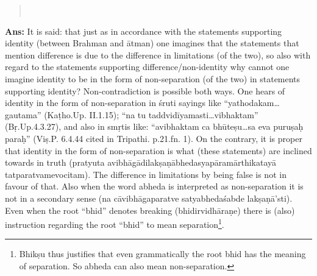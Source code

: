 
\begin{verse}
\\
\end{verse}

\textbf{Ans:} It is said: that just as in accordance with the statements supporting identity (between Brahman and ātman) one imagines that the statements that mention difference  is due to the difference in limitations (of the two), so also with regard to the statements supporting difference/non-identity why cannot one imagine identity to be in the form of non-separation (of the two) in statements supporting identity? Non-contradiction is possible both ways. One hears of identity in the form of non-separation in śruti sayings like “yathodakam…gautama” (Kaṭho.Up. II.1.15); “na tu taddvidīyamasti…vibhaktam” (Bṛ.Up.4.3.27), and also in smṛtis like: “avibhaktam ca bhūteṣu…sa eva puruṣaḥ paraḥ” (Viṣ.P. 6.4.44 cited in Tripathi. p.21.fn. 1). On the contrary, it is proper that identity in the form of non-separation is what (these statements) are inclined towards in truth (pratyuta avibhāgādilakṣaṇābhedasya\break pāramārthikatayā tatparatvamevocitam). The difference in limitations by being false is not in favour of that. Also when the word abheda is interpreted as non-separation it is not in a secondary sense (na cāvibhāgaparatve satyabhedaśabde lakṣaṇā’sti). Even when the root “bhid” denotes breaking (bhidirvidhāraṇe) there is (also) instruction regarding the root “bhid” to mean separation\footnote{Bhikṣu thus justifies that even grammatically the root bhid has the meaning of separation. So abheda can also mean non-separation.}.

